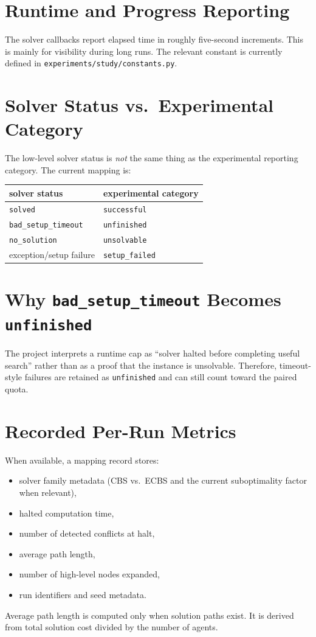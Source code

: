 \documentclass[11pt]{article}
\begin{document}
\section{Runtime and Progress Reporting}

The solver callbacks report elapsed time in roughly five-second increments. This is mainly for visibility during long runs. The relevant constant is currently defined in \texttt{experiments/study/constants.py}.

\section{Solver Status vs.\ Experimental Category}

The low-level solver status is \emph{not} the same thing as the experimental reporting category. The current mapping is:
\begin{center}
\begin{tabular}{ll}
\toprule
solver status & experimental category \\
\midrule
\texttt{solved} & \texttt{successful} \\
\texttt{bad\_setup\_timeout} & \texttt{unfinished} \\
\texttt{no\_solution} & \texttt{unsolvable} \\
exception/setup failure & \texttt{setup\_failed} \\
\bottomrule
\end{tabular}
\end{center}

\section{Why \texttt{bad\_setup\_timeout} Becomes \texttt{unfinished}}

The project interprets a runtime cap as ``solver halted before completing useful search'' rather than as a proof that the instance is unsolvable. Therefore, timeout-style failures are retained as \texttt{unfinished} and can still count toward the paired quota.

\section{Recorded Per-Run Metrics}

When available, a mapping record stores:
\begin{itemize}[leftmargin=2em]
    \item solver family metadata (CBS vs.\ ECBS and the current suboptimality factor when relevant),
    \item halted computation time,
    \item number of detected conflicts at halt,
    \item average path length,
    \item number of high-level nodes expanded,
    \item run identifiers and seed metadata.
\end{itemize}

Average path length is computed only when solution paths exist. It is derived from total solution cost divided by the number of agents.
\end{document}
